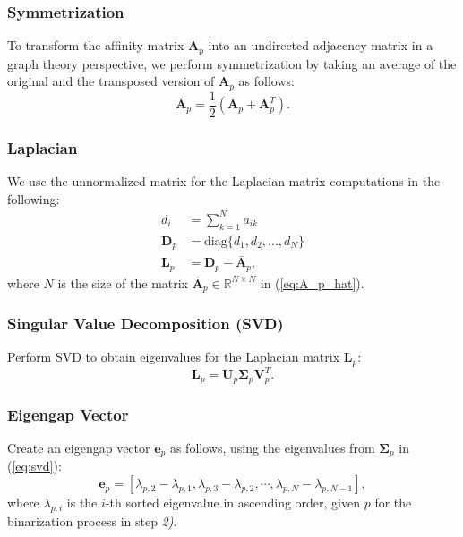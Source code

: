 \documentclass[journal]{IEEEtran}
\begin{document}
  \subsubsection{Symmetrization} To transform the affinity matrix $\mathbf{A}_p$ into an undirected adjacency matrix in a graph theory perspective, we perform symmetrization by taking an average of the original and the transposed version of $\mathbf{A}_p$ as follows: 
  \begin{equation}
  \label{eq:A_p_hat}
    \mathbf{\bar{A}}_p =\frac{1}{2}(\mathbf{A}_p + \mathbf{A}_{p}^{T}).
  \end{equation}
  \subsubsection{Laplacian} We use the unnormalized matrix for the Laplacian matrix computations \cite{von2007tutorial} in the following:
\begin{equation}
\begin{split}
    d_{i} &= \sum_{k=1}^{N} a_{ik} \\
    \mathbf{D}_{p} &=\text{diag}\{d_{1}, d_{2}, ..., d_{N}\} \\
    \mathbf{L}_{p} &= \mathbf{D}_{p} - \mathbf{\bar{A}}_{p},
\end{split}
\end{equation}
where $N$ is the size of the matrix $\mathbf{\bar{A}}_p \in \mathbb{R}^{N \times N}$ in (\ref{eq:A_p_hat}).

  \subsubsection{Singular Value Decomposition (SVD)} Perform SVD to obtain eigenvalues for the Laplacian matrix $\mathbf{L}_p$:
     \begin{equation}
     \label{eq:svd}
        \mathbf{L}_{p}=\mathbf{U}_{p}\mathbf{\Sigma}_{p}\mathbf{V}_{p}^{T}.
     \end{equation}
    \subsubsection{Eigengap Vector} Create an eigengap vector $\mathbf{e}_{p}$ as follows, using the eigenvalues from $\mathbf{\Sigma}_{p}$ in (\ref{eq:svd}):
    \begin{equation}
        \label{eq:eig_vec}
            \mathbf{e}_{p} = [\lambda_{p,2}-\lambda_{p,1}, \lambda_{p,3}-\lambda_{p,2}, \cdots, \lambda_{p,N} -\lambda_{p,N-1}],
        \end{equation}
    where $\lambda_{p,i}$ is the $i$-th sorted eigenvalue in ascending order, given $p$ for the binarization process in step \textit{2)}. 
    \vspace{0.3ex}
\end{document}
